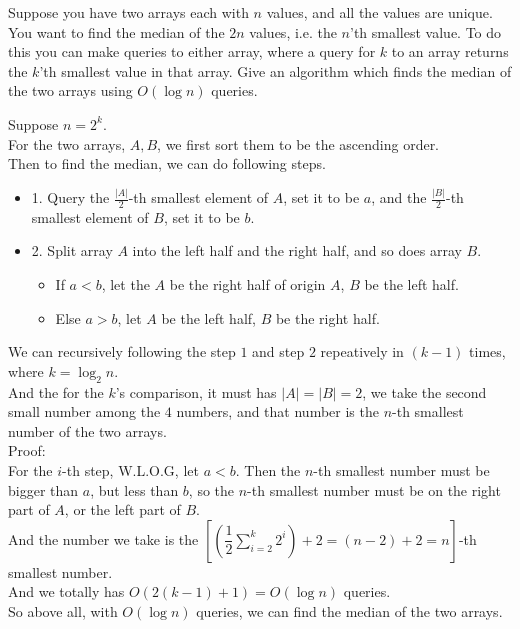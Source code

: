 \problem{}
Suppose you have two arrays each with $n$ values, and all the values are unique.  You want to find the median of the $2n$ values, i.e. the $n$'th smallest value.  To do this you can make queries to either array, where a query for $k$ to an array returns the $k$'th smallest value in that array.  Give an algorithm which finds the median of the two arrays using $O(\log n)$ queries.  

\solution{}

Suppose $n=2^k$.\\
For the two arrays, $A,B$, we first sort them to be the ascending order.\\
Then to find the median, we can do following steps.
\begin{itemize}
    \item 1. Query the $\frac{|A|}{2}$-th smallest element of $A$, set it to be $a$, and the $\frac{|B|}{2}$-th smallest element of $B$, set it to be $b$.
    \item 2. Split array $A$ into the left half and the right half, and so does array $B$.
    \begin{itemize}
        \item If $a<b$, let the $A$ be the right half of origin $A$, $B$ be the left half.
        \item Else $a>b$, let $A$ be the left half, $B$ be the right half.
    \end{itemize}
\end{itemize}

We can recursively following the step $1$ and step $2$ repeatively in $(k-1)$ times, where $k=\log_{2}{n}$.\\
And the for the $k$'s comparison, it must has $|A|=|B|=2$, we take the second small number among the $4$ numbers, and that number is the $n$-th smallest number of the two arrays.\\

Proof:\\
For the $i$-th step, W.L.O.G, let $a<b$. Then the $n$-th smallest number must be bigger than $a$, but less than $b$, so the $n$-th smallest number must be on the right part of $A$, or the left part of $B$.\\
And the number we take is the $\left[\left(\dfrac{1}{2}\sum\limits_{i=2}^{k}2^i\right)+2=(n-2)+2=n\right]$-th smallest number.\\
And we totally has $O(2(k-1)+1)=O(\log n)$ queries.\\

So above all, with $O(\log n)$ queries, we can find the median of the two arrays.\\

\newpage
